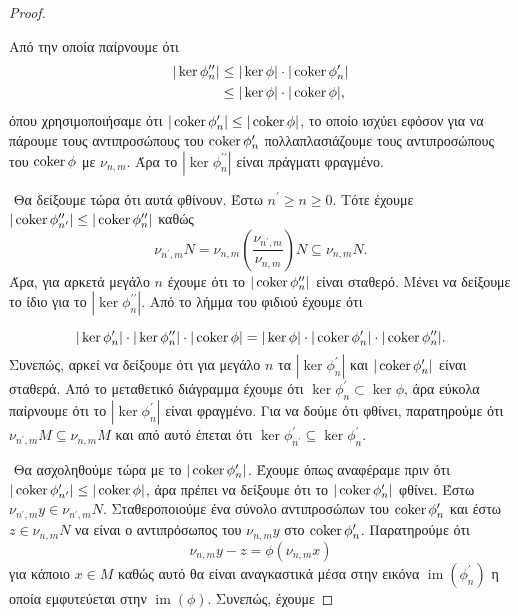 \begin{proof}
\begin{figure}[H]
    \centering
\end{figure}
\noindent Από την οποία παίρνουμε ότι
\begin{align*}
|\ker\phi^{\prime\prime}_n| &\leq |\ker\phi| \cdot |\operatorname{coker}\phi^{\prime}_n| \\
&\leq |\ker\phi|\cdot |\operatorname{coker}\phi| ,
\end{align*} όπου χρησιμοποιήσαμε ότι $|\operatorname{coker}\phi^\prime_n| \leq |\operatorname{coker}\phi|$, το οποίο ισχύει εφόσον για να πάρουμε τους αντιπροσώπους του $\operatorname{coker}\phi^\prime_n$ πολλαπλασιάζουμε τους αντιπροσώπους του $\operatorname{coker}\phi$ με $\nu_{n,m}$. 
Άρα το $|\ker\phi^{\prime\prime}_n|$ είναι πράγματι φραγμένο.

$ $\newline
Θα δείξουμε τώρα ότι αυτά φθίνουν. Έστω $n^\prime \geq n \geq 0$. Τότε έχουμε $|\operatorname{coker}\phi^{\prime\prime}_{n^\prime}| \leq |\operatorname{coker}\phi^{\prime\prime}_n|$ καθώς
$$\nu_{n^\prime,m}N = \nu_{n,m}\left(\frac{\nu_{n^\prime,m}}{\nu_{n,m}}\right)N \subseteq \nu_{n,m}N .$$ Άρα, για αρκετά μεγάλο $n$ 
έχουμε ότι το $|\operatorname{coker}\phi^{\prime\prime}_n|$ είναι σταθερό. Μένει να δείξουμε το ίδιο για το $|\ker\phi^{\prime\prime}_n|$. Από το 
λήμμα του φιδιού έχουμε ότι

$$|\ker\phi^\prime_n| \cdot |\ker\phi^{\prime\prime}_n| \cdot | \operatorname{coker}\phi| = |\ker\phi| \cdot |\operatorname{coker}\phi^\prime_n| \cdot 
|\operatorname{coker}\phi^{\prime\prime}_n|.$$ Συνεπώς, αρκεί να δείξουμε ότι για μεγάλο $n$ τα $|\ker\phi^{\prime}_n|$ και $|\operatorname{coker}\phi^\prime_n|$ είναι σταθερά. 
Από το μεταθετικό διάγραμμα έχουμε ότι $\ker\phi^\prime_n \subset \ker\phi$, άρα εύκολα παίρνουμε ότι το $|\ker\phi^\prime_n|$ είναι φραγμένο. Για να δούμε ότι φθίνει, παρατηρούμε ότι $\nu_{n^\prime,m} M \subseteq \nu_{n,m}M$ και από αυτό έπεται ότι $\ker\phi^\prime_{n^\prime}\subseteq \ker\phi^\prime_n$.

$ $\newline
Θα ασχοληθούμε τώρα με το $|\operatorname{coker}\phi^\prime_n|$. Έχουμε όπως αναφέραμε πριν ότι $|\operatorname{coker}\phi^\prime_{n^\prime}| \leq |\operatorname{coker}\phi|$, άρα πρέπει να δείξουμε ότι το $|\operatorname{coker}\phi^\prime_n|$ φθίνει. Έστω $\nu_{n^\prime,m}y\in \nu_{n^\prime,m}N$. Σταθεροποιούμε ένα σύνολο αντιπροσώπων του $\operatorname{coker}\phi^\prime_n$ και έστω $z\in \nu_{n,m}N$ να είναι ο αντιπρόσωπος του $\nu_{n,m}y$ στο $\operatorname{coker}\phi^\prime_n$. Παρατηρούμε ότι 
$$\nu_{n,m}y - z = \phi(\nu_{n,m}x)$$ για κάποιο $x \in M$ καθώς αυτό θα είναι αναγκαστικά μέσα στην εικόνα $\operatorname{im}(\phi^\prime_n)$ η οποία εμφυτεύεται στην $\operatorname{im}(\phi)$. Συνεπώς, έχουμε 


\end{proof}
